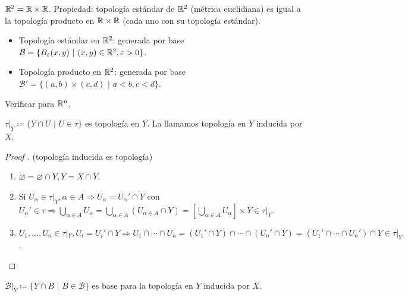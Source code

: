 \begin{eg}[importante]
	$\mathbb{R}^2 = \mathbb{R} \times \mathbb{R}$. Propiedad: topología estándar de $\mathbb{R}^2$ (métrica euclidiana) es igual a la topología producto en $\mathbb{R} \times \mathbb{R}$ (cada uno con su topología estándar).
	\begin{itemize}
		\item Topología estándar en $\mathbb{R}^2$: generada por base $\mathcal{B} = \{ B_{\varepsilon} (x,y) \text{ | } (x,y) \in \mathbb{R}^2, \varepsilon > 0 \}$.

		\item Topología producto en $\mathbb{R}^2$: generada por base $\mathcal{B}' = \{ (a,b) \times (c,d) \text{ | } a < b, c < d \}$.  
	\end{itemize}
\end{eg}

\begin{ex}
	Verificar para $\mathbb{R}^n$.
\end{ex}

\begin{definition}
	$\tau|_Y \coloneq \{ Y \cap U \text{ | } U \in \tau \}$ es topología en $Y$. La llamamos topología en $Y$ inducida por $X$.  
\end{definition}

\begin{proof}[Proof ] (topología inducida es topología)
	\begin{enumerate}
		\item $\varnothing = \varnothing \cap Y, Y = X \cap Y$.

		\item Si $U_{\alpha} \in \tau|_Y, \alpha \in A \Rightarrow U_{\alpha} = U_{\alpha}' \cap Y$ con $U_{\alpha}' \in \tau \Rightarrow \bigcup_{\alpha \in A} U_{\alpha} = \bigcup_{\alpha \in A} (U_{\alpha \in A} \cap Y) = \left[ \bigcup_{\alpha \in A} U_{\alpha} \right] \times Y \in \tau|_Y$.

		\item $U_1,\dots,U_n \in \tau|_Y, U_i = U_i' \cap Y \Rightarrow U_1 \cap \cdots \cap U_n = (U_1' \cap Y) \cap \cdots \cap (U_n' \cap Y) = (U_1' \cap \cdots \cap U_n') \cap Y \in \tau|_Y$.
	\end{enumerate}
\end{proof}

\begin{lemma}
	$\mathcal{B}|_Y \coloneq \{ Y \cap B \text{ | } B \in \mathcal{B} \}$ es base para la topología en $Y$ inducida por $X$.  
\end{lemma}

